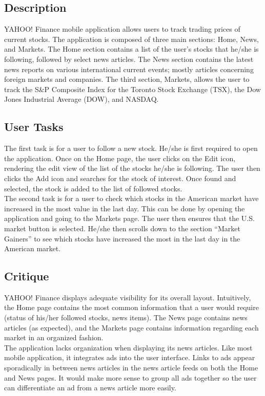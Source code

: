 \documentclass{sigchi}
\begin{document}
\subsection{Description}
YAHOO! Finance mobile application allows users to track trading prices of current stocks. The application is composed of three main sections: Home, News, and Markets. The Home section contains a list of the user’s stocks that he/she is following, followed by select news articles. The News section contains the latest news reports on various international current events; mostly articles concerning foreign markets and companies. The third section, Markets, allows the user to track the S&P Composite Index for the Toronto Stock Exchange (TSX), the Dow Jones Industrial Average (DOW), and NASDAQ. 

\subsection{User Tasks}
The first task is for a user to follow a new stock. He/she is first required to open the application. Once on the Home page, the user clicks on the Edit icon, rendering the edit view of the list of the stocks he/she is following. The user then clicks the Add icon and searches for the stock of interest. Once found and selected, the stock is added to the list of followed stocks.\\

The second task is for a user to check which stocks in the American market have increased in the most value in the last day. This can be done by opening the application and going to the Markets page. The user then ensures that the U.S. market button is selected. He/she then scrolls down to the section “Market Gainers” to see which stocks have increased the most in the last day in the American market.


\subsection{Critique}
YAHOO! Finance displays adequate visibility for its overall layout. Intuitively, the Home page contains the most common information that a user would require (status of his/her followed stocks, news items). The News page contains news articles (as expected), and the Markets page contains information regarding each market in an organized fashion. \\

The application lacks organization when displaying its news articles. Like most mobile application, it integrates ads into the user interface. Links to ads appear sporadically in between news articles in the news article feeds on both the Home and News pages. It would make more sense to group all ads together so the user can differentiate an ad from a news article more easily. 
\end{document}

